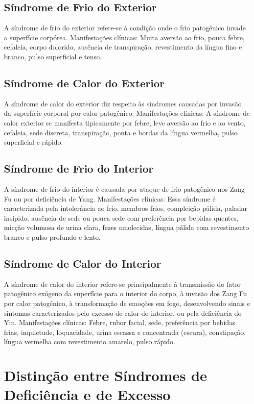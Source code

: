 \documentclass[12pt,oneside,a4paper]{book} %
\begin{document}
\subsection{Síndrome de Frio do Exterior}
A síndrome de frio do exterior refere-se à condição onde o frio patogênico invade a superfície corpórea.
Manifestações clínicas: Muita aversão ao frio, pouca febre, cefaleia, corpo dolorido, ausência de transpiração, revestimento da língua fino e branco, pulso superficial e tenso.

\subsection{Síndrome de Calor do Exterior}
A síndrome de calor do exterior diz respeito às síndromes causadas por invasão da superfície corporal por calor patogênico.
Manifestações clínicas: A síndrome de calor exterior se manifesta tipicamente por febre, leve aversão ao frio e ao vento, cefaleia, sede discreta, transpiração, ponta e bordas da língua vermelha, pulso superficial e rápido.

\subsection{Síndrome de Frio do Interior}
A síndrome de frio do interior é causada por ataque de frio patogênico nos Zang Fu ou por deficiência de Yang.
Manifestações clínicas: Essa síndrome é caracterizada pela intolerância ao frio, membros frios, compleição pálida, paladar insípido, ausência de sede ou pouca sede com preferência por bebidas quentes, micção volumosa de urina clara, fezes amolecidas, língua pálida com revestimento branco e pulso profundo e lento.

\subsection{Síndrome de Calor do Interior}
A síndrome de calor do interior refere-se principalmente à transmissão do fator patogênico exógeno da superfície para o interior do corpo, à invasão dos Zang Fu por calor patogênico, à transformação de emoções em fogo, desenvolvendo sinais e sintomas caracterizados pelo excesso de calor do interior, ou pela deficiência do Yin.
Manifestações clínicas: Febre, rubor facial, sede, preferência por bebidas frias, inquietude, loquacidade, urina escassa e concentrada (escura), constipação, língua vermelha com revestimento amarelo, pulso rápido.


\section{Distinção entre Síndromes de Deficiência e de Excesso}
\end{document}
